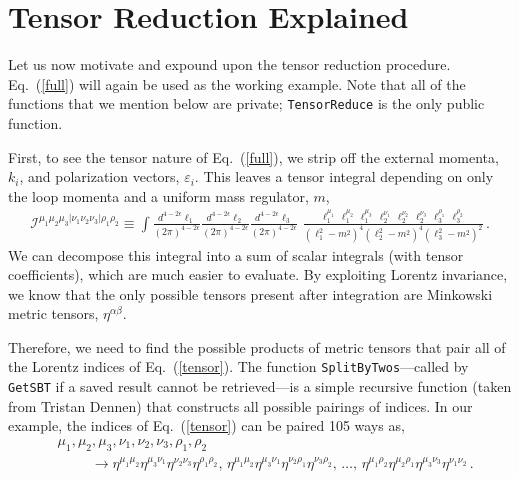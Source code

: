 \documentclass[aps,prd,preprint,eqsecnum,tightenlines,nofootinbib,showpacs]{revtex4}
\def\Eqn#1{Eq.~({\ref{#1}})}
\def\eqn#1{Eq.~({\ref{#1}})}
\begin{document}
\section{Tensor Reduction Explained}
\label{explained}

Let us now motivate and expound upon the tensor reduction procedure. \Eqn{full} will again be
used as the working example. Note that all of the functions that we mention below are private;
\texttt{TensorReduce} is the only public function.

First, to see the tensor nature of \eqn{full}, we strip off the external momenta, $k_{i}$, and polarization vectors, $\varepsilon_{i}$. This leaves a tensor integral depending on only the loop momenta and a uniform mass regulator, $m$,
\begin{align}
\mathcal{I}^{\mu_{1}\mu_{2}\mu_{3}|\nu_{1}\nu_{2}\nu_{3}|\rho_{1}\rho_{2}}
\equiv
\int 
\frac{d^{4-2\epsilon}\ell_{1}}{(2\pi)^{4-2\epsilon}}
\frac{d^{4-2\epsilon}\ell_{2}}{(2\pi)^{4-2\epsilon}}
\frac{d^{4-2\epsilon}\ell_{3}}{(2\pi)^{4-2\epsilon}}
\,\,
\frac{
\ell_{1}^{\mu_{1}}\, \ell_{1}^{\mu_{2}}\, \ell_{1}^{\mu_{3}}\,
\ell_{2}^{\nu_{1}}\, \ell_{2}^{\nu_{2}}\, \ell_{2}^{\nu_{3}}\,
\ell_{3}^{\rho_{1}}\, \ell_{3}^{\rho_{2}}
}
{(\ell_{1}^{2}-m^{2})^{4} (\ell_{2}^{2}-m^{2})^{4} (\ell_{3}^{2}-m^{2})^{2}} \,.
\label{tensor}
\end{align}
%
We can decompose this integral into a sum of scalar integrals (with tensor coefficients),
which are much easier to evaluate. By exploiting Lorentz invariance, we know that the only possible 
tensors present after integration are Minkowski metric tensors, $\eta^{\alpha\beta}$.

Therefore, we need to find the possible products of metric tensors that pair all of the Lorentz indices
of \eqn{tensor}. The function \texttt{SplitByTwos}---called by \texttt{GetSBT} if a saved result
cannot be retrieved---is a simple recursive function (taken from Tristan Dennen)
that constructs all possible pairings of indices. In our example, the indices of \eqn{tensor}
can be paired 105 ways as,
\begin{align}
&\mu_{1}, \mu_{2}, \mu_{3}, \nu_{1},\nu_{2},\nu_{3},\rho_{1},\rho_{2} \nonumber\\[.2cm]
&\hspace{1cm}\rightarrow
\eta^{\mu_{1}\mu_{2}}\eta^{\mu_{3}\nu_{1}}\eta^{\nu_{2}\nu_{3}}\eta^{\rho_{1}\rho_{2}}
,\, \eta^{\mu_{1}\mu_{2}}\eta^{\mu_{3}\nu_{1}}\eta^{\nu_{2}\rho_{1}}\eta^{\nu_{3}\rho_{2}}
,\, \ldots
,\, \eta^{\mu_{1}\rho_{2}}\eta^{\mu_{2}\rho_{1}}\eta^{\mu_{3}\nu_{3}}\eta^{\nu_{1}\nu_{2}}
\,.
\end{align}
\end{document}
